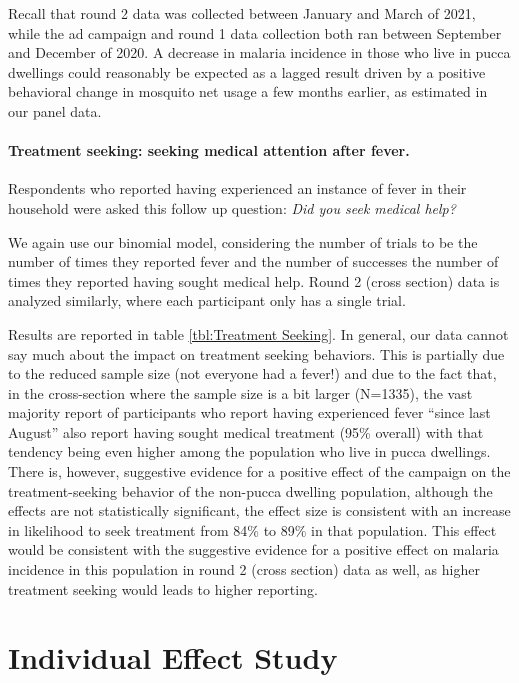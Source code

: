 \documentclass[a4paper,12pt]{article}
\begin{document}
Recall that round 2 data was collected between January and March of 2021, while the ad campaign and round 1 data collection both ran between September and December of 2020. A decrease in malaria incidence in those who live in pucca dwellings could reasonably be expected as a lagged result driven by a positive behavioral change in mosquito net usage a few months earlier, as estimated in our panel data.




\paragraph{Treatment seeking: seeking medical attention after fever.} Respondents who reported having experienced an instance of fever in their household were asked this follow up question: \textit{Did you seek medical help?}

We again use our binomial model, considering the number of trials to be the number of times they reported fever and the number of successes the number of times they reported having sought medical help. Round 2 (cross section) data is analyzed similarly, where each participant only has a single trial.

Results are reported in table \ref{tbl:Treatment Seeking}. In general, our data cannot say much about the impact on treatment seeking behaviors. This is partially due to the reduced sample size (not everyone had a fever!) and due to the fact that, in the cross-section where the sample size is a bit larger (N=1335), the vast majority report of participants who report having experienced fever ``since last August'' also report having sought medical treatment (95\% overall) with that tendency being even higher among the population who live in pucca dwellings. There is, however, suggestive evidence for a positive effect of the campaign on the treatment-seeking behavior of the non-pucca dwelling population, although the effects are not statistically significant, the effect size is consistent with an increase in likelihood to seek treatment from 84\% to 89\% in that population. This effect would be consistent with the suggestive evidence for a positive effect on malaria incidence in this population in round 2 (cross section) data as well, as higher treatment seeking would leads to higher reporting.





\section{Individual Effect Study} \label{individual-effect}
\end{document}
